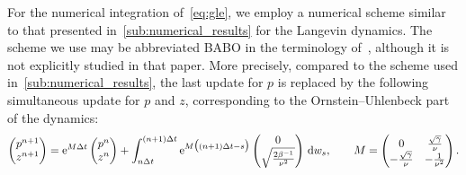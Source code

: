 \documentclass[11pt,a4paper]{article}
\begin{document}
For the numerical integration of~\eqref{eq:gle},
we employ a numerical scheme similar to that presented in~\cref{sub:numerical_results} for the Langevin dynamics.
The scheme we use may be abbreviated BABO in the terminology of~\cite{MR4379630},
although it is not explicitly studied in that paper.
More precisely, compared to the scheme used in~\cref{sub:numerical_results},
the last update for $p$ is replaced by the following simultaneous update for $p$ and $z$,
corresponding to the Ornstein--Uhlenbeck part of the dynamics:
\[
    \begin{pmatrix}
        p^{n+1} \\
        z^{n+1}
    \end{pmatrix}
    =
    \mathrm{e}^{M \Delta t}
    \begin{pmatrix}
        p^{n} \\
        z^{n}
    \end{pmatrix}
    + \int_{n \Delta t}^{(n+1)\Delta t} \mathrm{e}^{M \bigl((n+1) \Delta t - s\bigr)}
    \begin{pmatrix}
        0 \\
        \sqrt{\frac{2 \beta^{-1}}{\nu^2}}
    \end{pmatrix}
    \, \mathrm d w_s,
    \qquad M =
    \begin{pmatrix}
        0 & \frac{\sqrt{\gamma}}{\nu} \\
        - \frac{\sqrt{\gamma}}{\nu} & -   \frac{1}{\nu^2}
    \end{pmatrix}.
\]
\end{document}
